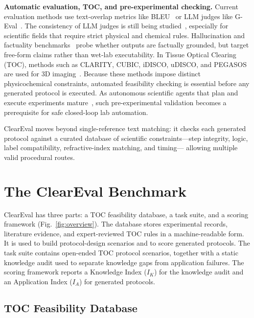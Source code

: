 \documentclass[conference]{IEEEtran}
\begin{document}
\noindent\textbf{Automatic evaluation, TOC, and pre-experimental checking.}
Current evaluation methods use text-overlap metrics like BLEU~\cite{papineni2002bleu} 
or LLM judges like G-Eval~\cite{liu2023geval}. The consistency of LLM judges is 
still being studied~\cite{li2024survey,zheng2023judging}, especially for scientific 
fields that require strict physical and chemical rules. Hallucination and factuality
benchmarks~\cite{bang2025hallulens,zhang2025survey} probe whether outputs are factually
grounded, but target free-form claims rather than wet-lab executability. In Tissue Optical Clearing
(TOC), methods such as CLARITY, CUBIC, iDISCO, uDISCO, and PEGASOS are used for 
3D imaging~\cite{chung2013clarity,ueda2020tissue,wang2025advances,
richardson2025unlocking,mai2024tissue}. Because these methods impose distinct
physicochemical constraints, automated feasibility checking is essential before
any generated protocol is executed. As autonomous scientific agents that plan and
execute experiments mature~\cite{boiko2023autonomous,hartung2025ai}, such pre-experimental
validation becomes a prerequisite for safe closed-loop lab automation.

ClearEval moves beyond single-reference text matching: it checks each
generated protocol against a curated database of scientific constraints—step
integrity, logic, label compatibility, refractive-index matching, and timing—
allowing multiple valid procedural routes.

\section{The ClearEval Benchmark}\label{sec:benchmark}

ClearEval has three parts: a TOC feasibility database, a task suite, and a
scoring framework (Fig.~\ref{fig:overview}). The database stores experimental
records, literature evidence, and expert-reviewed TOC rules in a machine-readable
form. It is used to build protocol-design scenarios and to score generated
protocols. The task suite contains open-ended TOC protocol scenarios, together
with a static knowledge audit used to separate knowledge gaps from application
failures. The scoring framework reports a Knowledge Index ($I_K$) for the
knowledge audit and an Application Index ($I_A$) for generated protocols.

\subsection{TOC Feasibility Database}
\end{document}
